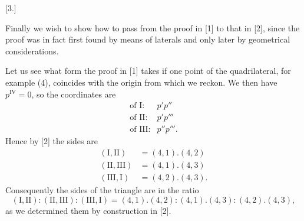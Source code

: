 
\begin{center}
[3.]
\end{center}

Finally we wish to show how to pass from the proof in [1] to that in [2], since
the proof was in fact first found by means of laterals and only later by geometrical
considerations.

Let us see what form the proof in [1] takes if one point of the quadrilateral, for\,example (4), coincides with
the origin from which we reckon. We then have $p^{\mathrm{IV}} = 0$, so the
coordinates are
\[
\begin{array}{rl}
\text{of I:} & p'p'' \\
\text{of II:} & p'p''' \\
\text{of III:} & p''p'''.
\end{array}
\]
Hence by [2] the sides are
\[
\begin{array}{rl}
(\text{I}, \text{II}) & = (4,1) . (4,2) \\
(\text{II}, \text{III}) & = (4,1) . (4,3) \\
(\text{III}, \text{I}) & = (4,2) . (4,3).
\end{array}
\]
Consequently the sides of the triangle are in the ratio
\[
(\text{I}, \text{II}) : (\text{II}, \text{III}) : (\text{III}, \text{I}) = (4,1) . (4,2) :
(4,1) . (4,3) : (4,2) . (4,3),
\]
as we determined them by construction in [2].

